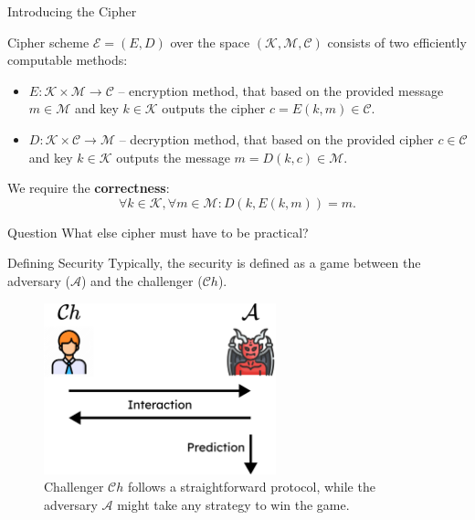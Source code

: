 \documentclass{beamer}
\begin{document}
    \begin{frame}{Introducing the Cipher}
        \begin{definition}
            Cipher scheme $\mathcal{E} = (E,D)$ over the space $(\mathcal{K}, \mathcal{M}, \mathcal{C})$ consists of two efficiently computable methods:
            \begin{itemize}
                \item $E: \mathcal{K} \times \mathcal{M} \to \mathcal{C}$ -- encryption method, that based on the provided message $m \in \mathcal{M}$ and key $k \in \mathcal{K}$ outputs the cipher $c = E(k,m) \in \mathcal{C}$.
                \item $D: \mathcal{K} \times \mathcal{C} \to \mathcal{M}$ -- decryption method, that based on the provided cipher $c \in \mathcal{C}$ and key $k \in \mathcal{K}$ outputs the message $m = D(k,c) \in \mathcal{M}$.
            \end{itemize}
        \end{definition}

        We require the \textbf{correctness}:
        \begin{equation*}
            \forall k \in \mathcal{K}, \forall m \in \mathcal{M}: D(k,E(k,m)) = m.
        \end{equation*}

        \begin{alertblock}{Question}
            What else cipher must have to be practical?
        \end{alertblock}
    \end{frame}

    \begin{frame}{Defining Security}
        Typically, the security is defined as a game between the adversary ($\mathcal{A}$) and the challenger ($\mathcal{C}h$).

        \begin{figure}
            \includegraphics[width=0.6\textwidth]{images/lecture_2/interaction.pdf}
            \caption{Challenger $\mathcal{C}h$ follows a straightforward protocol, while the adversary $\mathcal{A}$ might take any strategy to win the game.}
            \label{fig:wuuttt}
        \end{figure}
    \end{frame}
\end{document}
